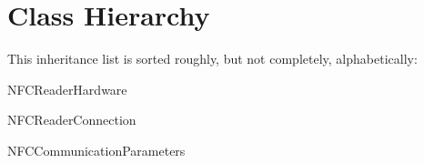\chapter{Class Hierarchy}
This inheritance list is sorted roughly, but not completely, alphabetically:
\begin{DoxyCompactList}
\item NFCReaderHardware\begin{DoxyCompactList}
\item NFCReaderConnection
\item NFCCommunicationParameters
\end{DoxyCompactList}
\end{DoxyCompactList}
